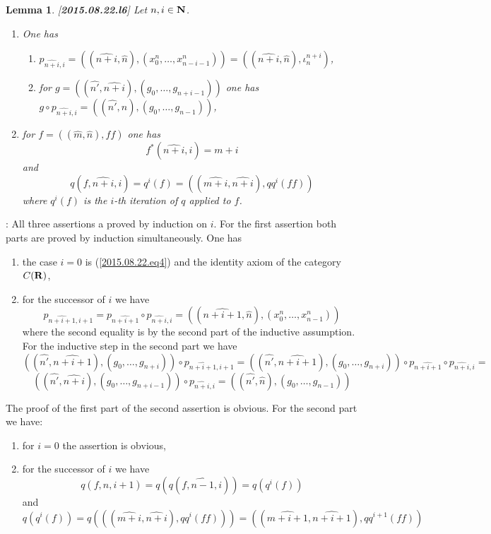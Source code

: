 \documentclass[11pt]{article}
\newenvironment{proof}{{\bf Proof}:}{\vskip 5mm }
\newtheorem{lemma}[proposition]{Lemma}
\newcommand{\llabel}[1]{\label{#1}[{\bf #1}]}
\newcommand{\nn}{{\bf N\rm}}
\newcommand{\nat}{\nn}
\newcommand{\rr}{{\bf R}}
\newcommand{\wh}{\widehat}
\begin{document}
\begin{lemma}
\llabel{2015.08.22.l6}
Let $n,i\in\nat$. 
%
\begin{enumerate}
\item One has
%
\begin{enumerate}
\item $p_{\wh{n+i},i}=((\wh{n+i},\wh{n}),(x_0^n,\dots,x_{n-i-1}^n))=((\wh{n+i},\wh{n}),\iota^{n+i}_{n})$,
\item for $g=((\wh{n'},\wh{n+i}),(g_0,\dots,g_{n+i-1}))$ one has $g\circ p_{\wh{n+i},i}=((\wh{n'},\wh{n}),(g_0,\dots,g_{n-1}))$,
\end{enumerate}
%
\item for $f=((\wh{m},\wh{n}),ff)$ one has
%
$$f^*(\wh{n+i},i)=m+i$$
%
and
%
$$q(f,\wh{n+i},i)=q^i(f)=((\wh{m+i},\wh{n+i}),qq^i(ff))$$
%
where $q^i(f)$ is the $i$-th iteration of $q$ applied to $f$.  
\end{enumerate}
\end{lemma}
%
\begin{proof}
All three assertions a proved by induction on $i$. For the first assertion both parts are proved by induction simultaneously. One has
%
\begin{enumerate}
\item the case $i=0$ is (\ref{2015.08.22.eq4}) and the identity axiom of the category $C(\rr)$,
\item for the successor of $i$ we have
%
$$p_{\wh{n+i+1},i+1}=p_{\wh{n+i+1}}\circ p_{\wh{n+i},i}=((\wh{n+i+1},\wh{n}),(x_0^n,\dots,x_{n-1}^n))$$
%
where the second equality is by the second part of the inductive assumption. For the inductive step in the second part we have
%
$$((\wh{n'},\wh{n+i+1}),(g_0,\dots,g_{n+i}))\circ p_{\wh{n+i+1},i+1}=((\wh{n'},\wh{n+i+1}),(g_0,\dots,g_{n+i}))\circ p_{\wh{n+i+1}}\circ p_{\wh{n+i},i}=$$$$
((\wh{n'},\wh{n+i}),(g_0,\dots,g_{n+i-1}))\circ p_{\wh{n+i},i}=((\wh{n'},\wh{n}),(g_0,\dots,g_{n-1}))$$
%
\end{enumerate}
%
The proof of the first part of the second assertion is obvious. For the second part we have:
%
\begin{enumerate}
\item for $i=0$ the assertion is obvious,
\item for the successor of $i$ we have 
%
$$q(f,\wh{n},i+1)=q(q(f,\wh{n-1},i))=q(q^i(f))$$
%
and 
$$q(q^i(f))=q(((\wh{m+i},\wh{n+i}),qq^i(ff)))=((\wh{m+i+1},\wh{n+i+1}),qq^{i+1}(ff))$$
%
\end{enumerate}
%
\end{proof}
%
\end{document}
